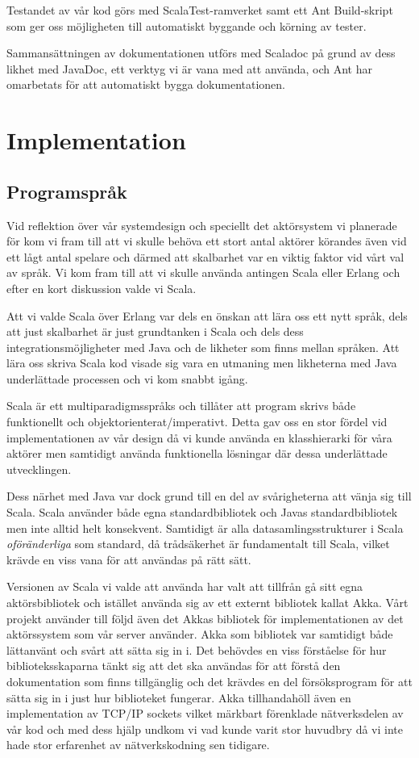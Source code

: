 \documentclass[a4paper]{article}
\begin{document}
Testandet av vår kod görs med ScalaTest-ramverket samt ett Ant Build-skript som ger oss möjligheten till automatiskt byggande och körning av tester.

Sammansättningen av dokumentationen utförs med Scaladoc på grund av dess likhet med JavaDoc, ett verktyg vi är vana med att använda, och Ant har omarbetats för att automatiskt bygga dokumentationen.

\section{Implementation}

\subsection{Programspråk}
Vid reflektion över vår systemdesign och speciellt det aktörsystem vi planerade för kom vi fram till att vi skulle behöva
ett stort antal aktörer körandes även vid ett lågt antal spelare och därmed att skalbarhet var en viktig faktor vid vårt
val av språk. Vi kom fram till att vi skulle använda antingen Scala eller Erlang och efter en kort diskussion valde vi Scala.

Att vi valde Scala över Erlang var dels en önskan att lära oss ett nytt språk, dels att just skalbarhet är just grundtanken
i Scala och dels dess integrationsmöjligheter med Java och de likheter som finns mellan språken. Att lära oss skriva Scala kod
visade sig vara en utmaning men likheterna med Java underlättade processen och vi kom snabbt igång.

Scala är ett multiparadigmsspråks och tillåter att program skrivs både funktionellt och objektorienterat/imperativt. Detta gav oss en stor
fördel vid implementationen av vår design då vi kunde använda en klasshierarki för våra aktörer men samtidigt använda 
funktionella lösningar där dessa underlättade utvecklingen.

Dess närhet med Java var dock grund till en del av svårigheterna att vänja sig till Scala. Scala använder både egna standardbibliotek
och Javas standardbibliotek men inte alltid helt konsekvent. Samtidigt är alla datasamlingsstrukturer i Scala \textit{oföränderliga} 
som standard, då trådsäkerhet är fundamentalt till Scala, vilket krävde en viss vana för att användas på rätt sätt.

Versionen av Scala vi valde att använda har valt att tillfrån gå sitt egna aktörsbibliotek och istället använda sig av ett externt
bibliotek kallat Akka. Vårt projekt använder till följd även det Akkas bibliotek för implementationen av det aktörssystem som
vår server använder. Akka som bibliotek var samtidigt både lättanvänt och svårt att sätta sig in i. Det behövdes en viss förståelse
för hur biblioteksskaparna tänkt sig att det ska användas för att förstå den dokumentation som finns tillgänglig och det krävdes
en del försöksprogram för att sätta sig in i just hur biblioteket fungerar. Akka tillhandahöll även en implementation av TCP/IP
sockets vilket märkbart förenklade nätverksdelen av vår kod och med dess hjälp undkom vi vad kunde varit stor huvudbry då vi inte
hade stor erfarenhet av nätverkskodning sen tidigare.
\end{document}
